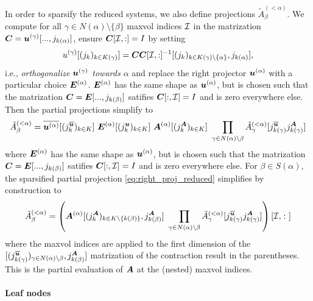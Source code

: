 \documentclass[a4wide]{article}
\begin{document}
In order to sparsify the reduced systems, we also define projections $\tilde{A}^{(<\alpha)}_\beta$. 
We compute for all $\gamma \in N(\alpha) \setminus \{\beta\}$ maxvol indices $\mathcal{I} $ in the matrization
${\boldsymbol{C}} = {\boldsymbol{u}}^{(\gamma)}[..., j_{k(\alpha)}]$, ensure ${\boldsymbol{C}}[\mathcal{I}, :] = I$ by setting 
\begin{equation*}
  u^{(\gamma)}[(j_k)_{k \in K(\gamma)}] = {\boldsymbol{C}} {\boldsymbol{C}}[\mathcal{I},:]^{-1} [(j_k)_{k \in K(\gamma) \setminus \{\alpha\}}, j_{k(\alpha)}],
\end{equation*}
i.e., \emph{orthogonalize ${\boldsymbol{u}}^{(\gamma)}$ towards $\alpha$}
and replace the right projector ${\boldsymbol{u}}^{(\alpha)}$ with a particular choice ${\boldsymbol{E}}^{(\alpha)}$. 
${\boldsymbol{E}}^{(\alpha)}$ has the same shape as ${\boldsymbol{u}}^{(\alpha)}$, but is chosen such that the matrization ${\boldsymbol{C}} = {\boldsymbol{E}}[..., j_{k(\beta)}]$ satifies  ${\boldsymbol{C}}[:, \mathcal{I}]= I$ and is zero everywhere else.
Then the partial projections simplify to
\begin{equation}
  \label{eq:right_proj_reduced}
  \tilde{A}^{(<\alpha)}_\beta
  = \overline{{\boldsymbol{u}}^{(\alpha)}}[(j_k^{\overline{{\boldsymbol{u}}}})_{k \in K}] \
  {\boldsymbol{E}}^{(\alpha)}[(j_k^{{\boldsymbol{u}}})_{k \in K}] \
  {\boldsymbol{A}}^{(\alpha)}[(j_k^{{\boldsymbol{A}}})_{k \in K}] \
  \prod_{\gamma \in N(\alpha) \setminus {\beta}} \tilde{A}^{(<\alpha)}_\gamma
  [j_{k(\gamma)}^{\overline{{\boldsymbol{u}}}} j_{k(\gamma)}^{{\boldsymbol{A}}}]
\end{equation}
where ${\boldsymbol{E}}^{(\alpha)}$ has the same shape as ${\boldsymbol{u}}^{(\alpha)}$, but is chosen such that the matrization ${\boldsymbol{C}} = {\boldsymbol{E}}[..., j_{k(\beta)}]$ satifies  ${\boldsymbol{C}}[:, \mathcal{I}]= I$ and is zero everywhere else.
For $\beta \in S(\alpha)$, the sparsified partial projection \eqref{eq:right_proj_reduced} simplifies by construction to
\begin{equation}
  \label{eq:right_proj_reduced_simplified}
  \tilde{A}^{(<\alpha)}_\beta
  = 
  \left( {\boldsymbol{A}}^{(\alpha)}[(j_k^{{\boldsymbol{A}}})_{k \in K \setminus \{k(\beta)\}}, j_{k(\beta)}^{{\boldsymbol{A}}}] \
  \prod_{\gamma \in N(\alpha) \setminus {\beta}} \tilde{A}^{(<\alpha)}_\gamma
  [j_{k(\gamma)}^{\overline{{\boldsymbol{u}}}} j_{k(\gamma)}^{{\boldsymbol{A}}}] \right)
  [\mathcal{I}, \colon]
\end{equation}
where the maxvol indices are applied to the first dimension of the $[(j_{k(\gamma)}^{\overline{{\boldsymbol{u}}}})_{\gamma \in N(\alpha) \setminus {\beta}}, j_{k(\beta)}^{{\boldsymbol{A}}}]$ matrization of the contraction result in the parentheses.
This is the partial evaluation of ${\boldsymbol{A}}$ at the (nested) maxvol indices.

\paragraph{Leaf nodes}
\end{document}
